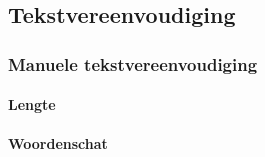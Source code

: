 \chapter{}%
\label{ch:stand-van-zaken}



\section{Tekstvereenvoudiging}


\subsection{Manuele tekstvereenvoudiging}


\subsubsection{Lengte}

\subsubsection{Woordenschat}

